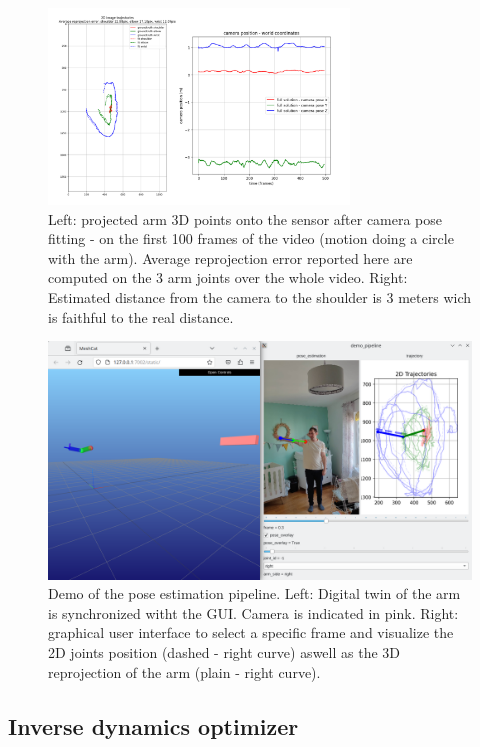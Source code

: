 \begin{figure}
    \centering
    \includegraphics[width=8cm]{figures/camera_pose_fitting_collage.png}
    \caption{Left: projected arm 3D points onto the sensor after camera pose fitting - on the first 100 frames of the video (motion doing a circle with the arm). Average reprojection error reported here are computed on the 3 arm joints over the whole video.
    Right: Estimated distance from the camera to the shoulder is 3 meters wich is faithful to the real distance.}
    \label{fig:camera_fitting}
\end{figure}

\begin{figure}
    \centering
    \includegraphics[width=16cm]{figures/arm_demo.png}
    \caption{Demo of the pose estimation pipeline.
    Left: Digital twin of the arm is synchronized witht the GUI. Camera is indicated in pink.
    Right: graphical user interface to select a specific frame
    and visualize the 2D joints position (dashed - right curve) aswell as the 3D reprojection of the arm (plain - right curve).}
    \label{fig:demo}
\end{figure}



\subsection{Inverse dynamics optimizer}

